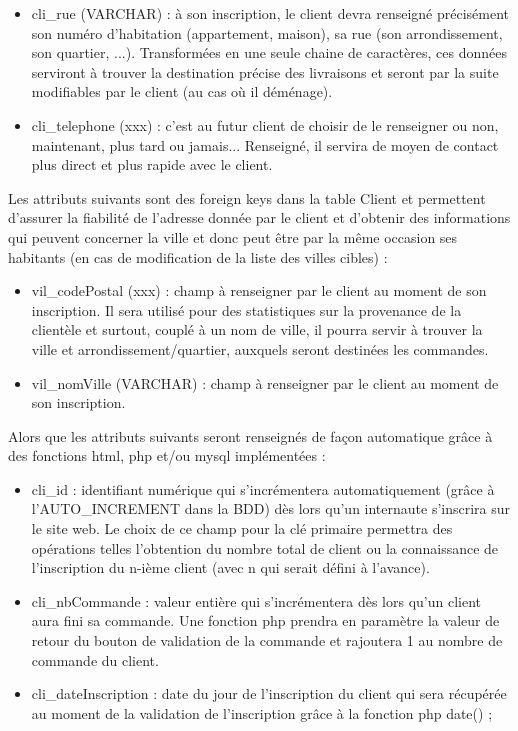 \documentclass[a4paper, 12pt]{report}
\begin{document}
\begin{spacing}{1.2}
\begin{itemize}
	\item cli\_rue (VARCHAR) : à son inscription, le client devra renseigné précisément son numéro d'habitation (appartement, maison), sa rue (son arrondissement, son quartier, ...). Transformées en une seule chaine de caractères, ces données serviront à trouver la destination précise des livraisons et seront par la suite modifiables par le client (au cas où il déménage).
	\item cli\_telephone (xxx) : c'est au futur client de choisir de le renseigner ou non, maintenant, plus tard ou jamais... Renseigné, il servira de moyen de contact plus direct et plus rapide avec le client.
\end{itemize}
Les attributs suivants sont des foreign keys dans la table Client et permettent d'assurer la fiabilité de l'adresse donnée par le client et d'obtenir des informations qui peuvent concerner la ville et donc peut être par la même occasion ses habitants (en cas de modification de la liste des villes cibles) :
\begin{itemize}
	\item vil\_codePostal (xxx) : champ à renseigner par le client au moment de son inscription. Il sera utilisé pour des statistiques sur la provenance de la clientèle et surtout, couplé à un nom de ville, il pourra servir à trouver la ville et arrondissement/quartier, auxquels seront destinées les commandes.
	\item vil\_nomVille (VARCHAR) : champ à renseigner par le client au moment de son inscription.
\end{itemize}
Alors que les attributs suivants seront renseignés de façon automatique grâce à des fonctions html, php et/ou mysql implémentées :
\begin{itemize}
	\item cli\_id : identifiant numérique qui s'incrémentera automatiquement (grâce à l'AUTO\_INCREMENT dans la BDD) dès lors qu'un internaute s'inscrira sur le site web. Le choix de ce champ pour la clé primaire permettra des opérations telles l'obtention du nombre total de client ou la connaissance de l'inscription du n-ième client (avec n qui serait défini à l'avance).
	\item cli\_nbCommande : valeur entière qui s'incrémentera dès lors qu'un client aura fini sa commande. Une fonction php prendra en paramètre la valeur de retour du bouton de validation de la commande et rajoutera 1 au nombre de commande du client.
	\item cli\_dateInscription : date du jour de l'inscription du client qui sera récupérée au moment de la validation de l'inscription grâce à la fonction php date() ;
\end{itemize}


\end{spacing}
\end{document}
